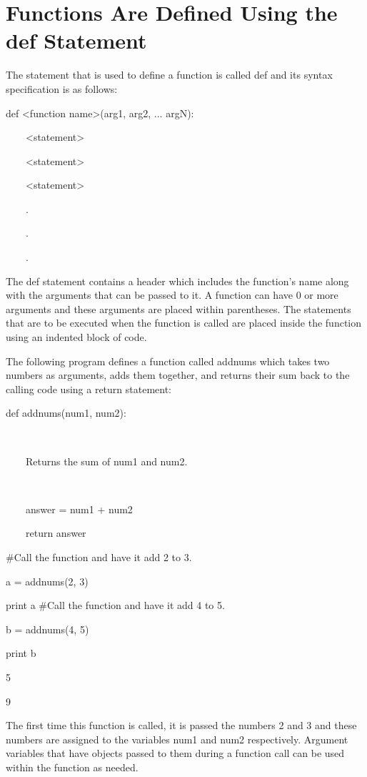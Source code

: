 \documentclass[12pt,oneside]{book}
\begin{document}
\section[Functions Are Defined Using the def Statement]{Functions Are Defined Using the def Statement}

The statement that is used to define a function is called def and its syntax specification is as follows: 

def {\textless}function name{\textgreater}(arg1, arg2, ... argN):

\ \ \ \ {\textless}statement{\textgreater}

\ \ \ \ {\textless}statement{\textgreater}

\ \ \ \ {\textless}statement{\textgreater}

\ \ \ \ .

\ \ \ \ .

\ \ \ \ .


The def statement contains a header which includes the function's name along with the arguments that can be passed to it. A function can have 0 or more arguments and these arguments are placed within parentheses. The statements that are to be executed when the function is called are placed inside the function using an indented block of code. 


The following program defines a function called addnums which takes two numbers as arguments, adds them together, and returns their sum back to the calling code using a return statement: 

def addnums(num1, num2):

\ \ \ \ {\textquotedbl}{\textquotedbl}{\textquotedbl}

\ \ \ \ Returns the sum of num1 and num2.

\ \ \ \ {\textquotedbl}{\textquotedbl}{\textquotedbl}

\ \ \ \ answer = num1 + num2

\ \ \ \ return answer


\#Call the function and have it add 2 to 3.

a = addnums(2, 3)

print a
\#Call the function and have it add 4 to 5.

b = addnums(4, 5)

print b

{\textbar}

5

9

The first time this function is called, it is passed the numbers 2 and 3 and these numbers are assigned to the variables num1 and num2 respectively. Argument variables that have objects passed to them during a function call can be used within the function as needed. 
\end{document}
